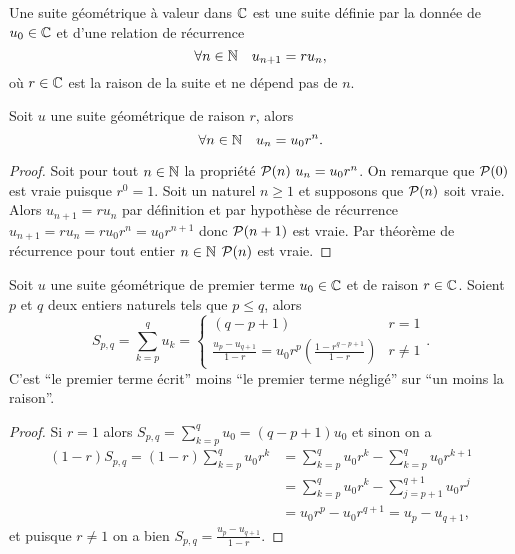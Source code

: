 \begin{defdef}
  Une suite géométrique à valeur dans $\C$ est une suite définie par la donnée de $u_0\in\C$ et d'une relation de récurrence
  \begin{equation}
    \forall n \in \N \quad u_{n+1}=ru_n,
  \end{equation}
  où $r\in\C$ est la raison de la suite et ne dépend pas de $n$.
\end{defdef}
\begin{prop}
  Soit $u$ une suite géométrique de raison $r$, alors
  \begin{equation}
    \forall n \in \N \quad u_n=u_0r^n.
  \end{equation}
\end{prop}
\begin{proof}
  Soit pour tout $n\in\N$ la propriété $\P(n)\ u_n=u_0r^n$. On remarque que $\P(0)$ est vraie puisque $r^0=1$. Soit un naturel $n\geq 1$ et supposons que $\P(n)$ soit vraie. Alors $u_{n+1}=r u_n$ par définition et par hypothèse de récurrence $u_{n+1}=r u_n = r u_0 r^n=u_0 r^{n+1}$ donc $\P(n+1)$ est vraie. Par théorème de récurrence pour tout entier $n\in\N$ $\P(n)$ est vraie.
\end{proof}
\begin{prop}
  Soit $u$ une suite géométrique de premier terme $u_0\in\C$ et de raison $r\in\C$. Soient $p$ et $q$ deux entiers naturels tels que $p\leq q$, alors
  \begin{equation}
    S_{p,q}=\sum_{k=p}^q u_k=
    \begin{cases}
      (q-p+1) & r=1 \\
      \frac{u_p-u_{q+1}}{1-r}=u_0r^p\left(\frac{1-r^{q-p+1}}{1-r}\right) & r \neq 1
    \end{cases}.
  \end{equation}
  C'est ``le premier terme écrit'' moins ``le premier terme négligé'' sur ``un moins la raison''.
\end{prop}
\begin{proof}
  Si $r=1$ alors $S_{p,q}=\sum_{k=p}^qu_0=(q-p+1)u_0$ et sinon on a
  \begin{align}
    (1-r)S_{p,q}=(1-r)\sum_{k=p}^q u_0r^k &= \sum_{k=p}^q u_0r^k - \sum_{k=p}^q u_0r^{k+1}\\
&=\sum_{k=p}^q u_0r^k - \sum_{j=p+1}^{q+1} u_0r^{j}\\
&=u_0 r^p -u_0 r^{q+1} = u_p-u_{q+1},
  \end{align}
et puisque $r\neq 1$ on a bien  $S_{p,q}=\frac{u_p-u_{q+1}}{1-r}$.
\end{proof}
